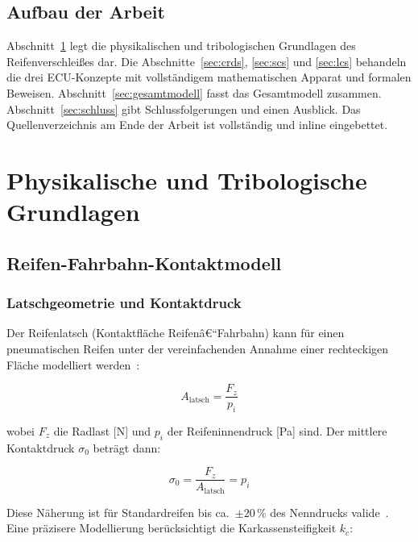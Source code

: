 ﻿\documentclass[12pt,a4paper]{article}
\theoremstyle{definition}
\theoremstyle{remark}
\newcommand{\Fz}{F_z}
\begin{document}
\subsection{Aufbau der Arbeit}

Abschnitt~\ref{sec:grundlagen} legt die physikalischen und tribologischen Grundlagen
des Reifenverschleißes dar. Die Abschnitte~\ref{sec:crds}, \ref{sec:scs} und
\ref{sec:lcs} behandeln die drei ECU-Konzepte mit vollständigem mathematischen Apparat
und formalen Beweisen. Abschnitt~\ref{sec:gesamtmodell} fasst das Gesamtmodell zusammen.
Abschnitt~\ref{sec:schluss} gibt Schlussfolgerungen und einen Ausblick.
Das Quellenverzeichnis am Ende der Arbeit ist vollständig und inline eingebettet.

\section{Physikalische und Tribologische Grundlagen}
\label{sec:grundlagen}

\subsection{Reifen-Fahrbahn-Kontaktmodell}

\subsubsection{Latschgeometrie und Kontaktdruck}

Der Reifenlatsch (Kontaktfläche Reifenâ€“Fahrbahn) kann für einen pneumatischen
Reifen unter der vereinfachenden Annahme einer rechteckigen Fläche modelliert
werden~\cite{Pacejka2012}:

\begin{equation}
  A_{\mathrm{latsch}} = \frac{\Fz}{p_i}
  \label{eq:latsch}
\end{equation}

wobei $\Fz$ die Radlast [\si{\newton}] und $p_i$ der Reifeninnendruck
[\si{\pascal}] sind. Der mittlere Kontaktdruck $\sigma_0$ beträgt dann:

\begin{equation}
  \sigma_0 = \frac{\Fz}{A_{\mathrm{latsch}}} = p_i
  \label{eq:kontaktdruck}
\end{equation}

Diese Näherung ist für Standardreifen bis ca.\ $\pm 20$\,\% des Nenndrucks
valide~\cite{Gent2006}. Eine präzisere Modellierung berücksichtigt die
Karkassensteifigkeit $k_c$:
\end{document}
